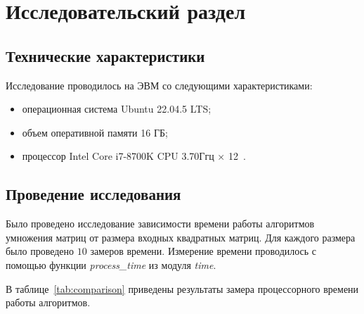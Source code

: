 \chapter{Исследовательский раздел}

\section{Технические характеристики}

Исследование проводилось на ЭВМ со следующими характеристиками:
\begin{itemize}[label=--]
    \item операционная система Ubuntu 22.04.5 LTS;
    \item объем оперативной памяти 16 ГБ;
    \item процессор Intel Core i7-8700K CPU 3.70Ггц × 12~\cite{processor}.
\end{itemize}

\section{Проведение исследования}

Было проведено исследование зависимости времени работы алгоритмов умножения матриц от размера входных квадратных матриц. Для каждого размера было проведено $10$ замеров времени. Измерение времени проводилось с помощью функции \textit{process\_time} из модуля \textit{time}.

В таблице~\ref{tab:comparison} приведены результаты замера процессорного времени работы алгоритмов.

